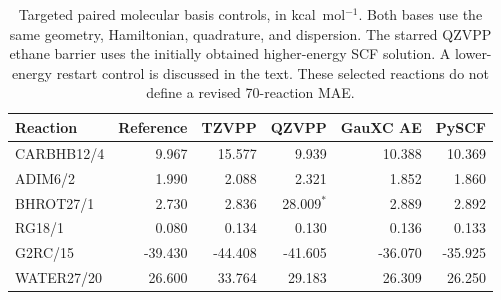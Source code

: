 \begin{table}[htbp]
\centering\small
\caption{Targeted paired molecular basis controls, in kcal~mol$^{-1}$. Both bases use the same geometry, Hamiltonian, quadrature, and dispersion. The starred QZVPP ethane barrier uses the initially obtained higher-energy SCF solution. A lower-energy restart control is discussed in the text. These selected reactions do not define a revised 70-reaction MAE.}
\label{tab:molecular-basis-controls}
\begin{tabular}{lrrrrr}
\toprule
Reaction & Reference & TZVPP & QZVPP & GauXC AE & PySCF\\
\midrule
CARBHB12/4 & 9.967 & 15.577 & 9.939 & 10.388 & 10.369\\
ADIM6/2 & 1.990 & 2.088 & 2.321 & 1.852 & 1.860\\
BHROT27/1 & 2.730 & 2.836 & 28.009$^{*}$ & 2.889 & 2.892\\
RG18/1 & 0.080 & 0.134 & 0.130 & 0.136 & 0.133\\
G2RC/15 & -39.430 & -44.408 & -41.605 & -36.070 & -35.925\\
WATER27/20 & 26.600 & 33.764 & 29.183 & 26.309 & 26.250\\
\bottomrule
\end{tabular}
\end{table}

